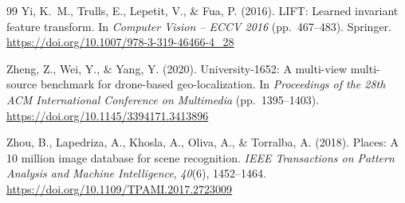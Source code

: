 \documentclass[english, Lau, oneside]{sapthesis}%
\begin{document}
\begin{thebibliography}{99}
Yi, K.~M., Trulls, E., Lepetit, V., \& Fua, P. (2016).
LIFT: Learned invariant feature transform.
In \textit{Computer Vision -- ECCV 2016} (pp.~467--483). Springer. \url{https://doi.org/10.1007/978-3-319-46466-4_28}

Zheng, Z., Wei, Y., \& Yang, Y. (2020).
University-1652: A multi-view multi-source benchmark for drone-based geo-localization.
In \textit{Proceedings of the 28th ACM International Conference on Multimedia} (pp.~1395--1403). \url{https://doi.org/10.1145/3394171.3413896}

Zhou, B., Lapedriza, A., Khosla, A., Oliva, A., \& Torralba, A. (2018).
Places: A 10 million image database for scene recognition.
\textit{IEEE Transactions on Pattern Analysis and Machine Intelligence}, \textit{40}(6), 1452--1464. \url{https://doi.org/10.1109/TPAMI.2017.2723009}

\end{thebibliography}
\end{document}
